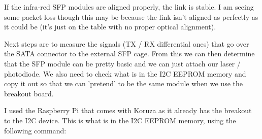If the infra-red \ac{SFP} modules are aligned properly, the link is stable.
I am seeing some packet loss though this may be because the link isn't aligned
as perfectly as it could be (it's just on the table with no proper optical
alignment).

Next steps are to measure the signals (TX / RX differential ones) that go over
the SATA connector to the external \ac{SFP} cage. From this we can then
determine that the \ac{SFP} module can be pretty basic and we can just attach
our laser / photodiode. We also need to check what is in the \ac{I2C} EEPROM
memory and copy it out so that we can 'pretend' to be the same module when
we use the breakout board.

I used the Raspberry Pi that comes with Koruza as it already has the breakout
to the I2C device. This is what is in the I2C EEPROM memory, using the
following command:

